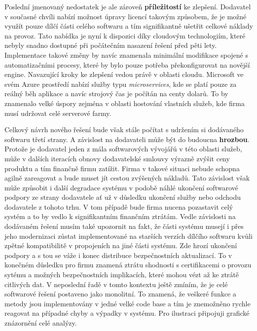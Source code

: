 \documentclass[12pt]{article}
\begin{document}
\begin{sloppypar}
\begin{spacing}{1.15}
        Poslední jmenovaný nedostatek je ale zároveň \textbf{příležitostí} ke
        zlepšení. Dodavatel v současné chvíli nabízí možnost úpravy licencí
        takovým způsobem, že je možné využít pouze dílčí části celého softwaru a
        tím signifikantně ušetřit celkové náklady na provoz. Tato nabídka je
        nyní k dispozici díky cloudovým technologiím, které nebyly snadno
        dostupné při počátečním nasazení řešení před pěti lety. Implementace takové 
        změny by navíc znamenala minimální modifikace spojené s automatizačními 
        procesy, které by bylo pouze potřeba překonfigurovat na novější engine. 
        Navazující kroky ke zlepšení vedou právě v oblasti cloudu. Microsoft ve
        svém Azure prostředí nabízí služby typu \textit{microservices}, kde se
        platí pouze za reálný běh aplikace a navíc strojový čas je počítán na
        centy dolarů. To by znamenalo velké úspory zejména v oblasti hostování
        vlastních služeb, kde firma musí udržovat celé serverové farmy. 

        Celkový návrh nového řešení bude však stále počítat s udržením si
        dodávaného softwaru třetí strany. A závislost na dodavateli může být
        do budoucna \textbf{hrozbou}. Protože je dodavatel jeden z mála
        softwarových vývojářů v této oblasti služeb, může v dalších iteracích
        obnovy dodavatelské smlouvy výrazně zvýšit ceny produktu a tím finančně 
        firmu zatížit. Firma v takové situaci nebude schopna agilně zareagovat a
        bude muset jít cestou zvýšených nákladů. Tato závislost však může
        způsobit i další degradace systému v podobě náhlé ukončení softwarové
        podpory ze strany dodavatele ať už v důsledku ukončení služby nebo
        odchodu dodavatele z tohoto trhu. V tom případě bude firma nucena
        pozastavit celý systém a to by vedlo k signifikantním finančním ztrátám.
        Vedle závislosti na dodávaném řešení musím také upozornit na fakt, že
        části systému musejí i přes jeho modernizaci zůstat implementované na
        starších verzích dílčího softwaru kvůli zpětné kompatibilitě v propojeních
        na jiné části systému. Zde hrozí ukončení podpory a s tou se váže i
        konec distribuce bezpečnostních aktualizací. To v konečném důsledku
        pro firmu znamená ztrátu shodnosti s certifikacemi o provozu sytému a
        možných bezpečnostních implikacích, které mohou vézt až ke ztrátě
        citlivých dat. V neposlední řadě v tomto kontextu ještě zmíním, že je celé
        softwarové řešení postaveno jako monolitní. To znamená, že veškeré
        funkce a metody jsou implementovány v jedné velké code base a tím je
        znemožněno rychle reagovat na případné chyby a výpadky v systému. Pro 
        ilustraci připojuji grafické znázornění celé analýzy.


\end{spacing}
\end{sloppypar}
\end{document}
